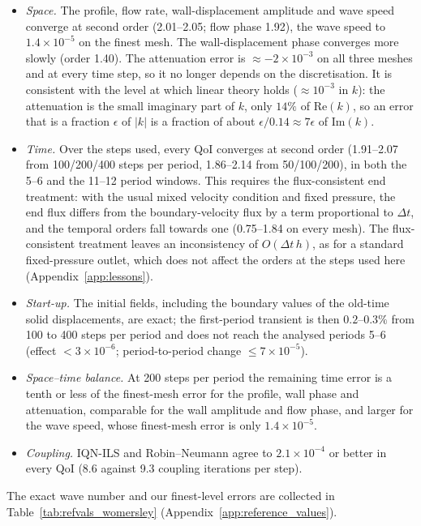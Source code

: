 \begin{itemize}
	\item \emph{Space.} The profile, flow rate, wall-displacement amplitude and wave speed converge at second order (2.01--2.05; flow phase 1.92), the wave speed to $1.4\times10^{-5}$ on the finest mesh. The wall-displacement phase converges more slowly (order 1.40). The attenuation error is $\approx-2\times10^{-3}$ on all three meshes and at every time step, so it no longer depends on the discretisation. It is consistent with the level at which linear theory holds ($\approx10^{-3}$ in $k$): the attenuation is the small imaginary part of $k$, only $14\%$ of $\mathrm{Re}(k)$, so an error that is a fraction $\epsilon$ of $|k|$ is a fraction of about $\epsilon/0.14 \approx 7\epsilon$ of $\mathrm{Im}(k)$.
	\item \emph{Time.} Over the steps used, every QoI converges at second order (1.91--2.07 from 100/200/400 steps per period, 1.86--2.14 from 50/100/200), in both the 5--6 and the 11--12 period windows. This requires the flux-consistent end treatment: with the usual mixed velocity condition and fixed pressure, the end flux differs from the boundary-velocity flux by a term proportional to $\Delta t$, and the temporal orders fall towards one (0.75--1.84 on every mesh). The flux-consistent treatment leaves an inconsistency of $O(\Delta t\,h)$, as for a standard fixed-pressure outlet, which does not affect the orders at the steps used here (Appendix~\ref{app:lessons}).
	\item \emph{Start-up.} The initial fields, including the boundary values of the old-time solid displacements, are exact; the first-period transient is then $0.2$--$0.3\%$ from 100 to 400 steps per period and does not reach the analysed periods 5--6 (effect $<3\times10^{-6}$; period-to-period change $\leq7\times10^{-5}$).
	\item \emph{Space--time balance.} At 200 steps per period the remaining time error is a tenth or less of the finest-mesh error for the profile, wall phase and attenuation, comparable for the wall amplitude and flow phase, and larger for the wave speed, whose finest-mesh error is only $1.4\times10^{-5}$.
	\item \emph{Coupling.} IQN-ILS and Robin--Neumann agree to $2.1\times10^{-4}$ or better in every QoI (8.6 against 9.3 coupling iterations per step).
\end{itemize}
The exact wave number and our finest-level errors are collected in Table~\ref{tab:refvals_womersley} (Appendix~\ref{app:reference_values}).

